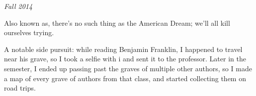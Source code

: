 \textit{Fall 2014}

Also known as, there's no such thing as the American Dream; we'll all kill
ourselves trying.

A notable side pursuit: while reading Benjamin Franklin, I happened to travel
near his grave, so I took a selfie with i and sent it to the professor.
Later in the semester, I ended up passing past the graves of multiple
other authors, so I made a map of every grave of authors from that class, and
started collecting them on road trips.





\groupendnotes


